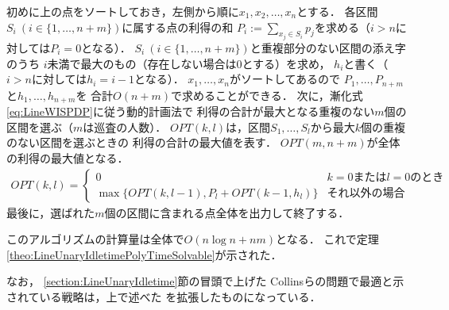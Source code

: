 初めに{\graphLine}上の点をソートしておき，左側から順に$x_1, x_2, \ldots, x_n$とする．
各区間$S_i\ (i \in \{ 1, \ldots, n + m \})$に属する点の利得の和
$P_i := \sum_{x_j \in S_i} p_j$を求める（$i > n$に対しては$P_i = 0$となる）．
$S_i\ (i \in \{ 1, \ldots, n + m \})$と重複部分のない区間の添え字のうち
$i$未満で最大のもの（存在しない場合は$0$とする）を求め，
$h_i$と書く（$i > n$に対しては$h_i = i - 1$となる）．
$x_1, \ldots, x_n$がソートしてあるので
$P_1, \ldots, P_{n + m}$と$h_1, \ldots, h_{n + m}$を
合計$O(n + m)$で求めることができる．
%
次に，漸化式\eqref{eq:LineWISPDP}に従う動的計画法で
利得の合計が最大となる重複のない$m$個の区間を選ぶ（$m$は巡査の人数）．
$\mathit{OPT}(k, l)$は，区間$S_1, \ldots, S_l$から最大$k$個の重複のない区間を選ぶときの
利得の合計の最大値を表す．
$\mathit{OPT}(m, n + m)$が全体の利得の最大値となる．
\begin{align}
  \label{eq:LineWISPDP}
  \mathit{OPT}(k, l) = 
  \begin{cases}
    0 & \text{$k = 0$または$l = 0$のとき} \\
    \max \{
      \mathit{OPT}(k, l - 1), 
      P_l + \mathit{OPT}(k - 1, h_l)
    \}
    & \text{それ以外の場合}
  \end{cases}
\end{align}
最後に，選ばれた$m$個の区間に含まれる点全体を出力して終了する．

このアルゴリズムの計算量は全体で$O(n \log n + nm)$となる．
これで定理\ref{theo:LineUnaryIdletimePolyTimeSolvable}が示された．

なお，
\ref{section:LineUnaryIdletime}節の冒頭で上げた
Collinsらの問題で最適と示されている戦略は，上で述べた
{\sepSectPatroll}を拡張したものになっている\cite[Theorem 2.1]{collins2013optimal}．

